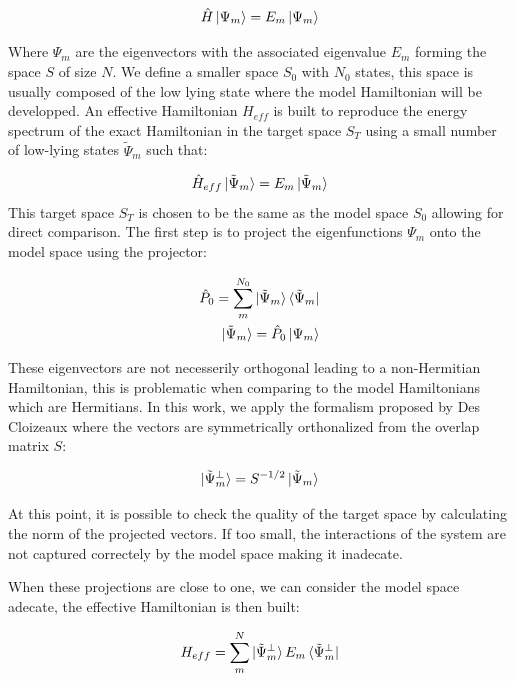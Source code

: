 \documentclass[10pt]{report}
\numberwithin{equation}{section}
\begin{document}
\begin{equation}
    \hat{H}\ket{\Psi_m}=E_m\ket{\Psi_m}
\end{equation}

Where $\Psi_m$ are the eigenvectors with the associated eigenvalue $E_m$ forming the space $S$ of size $N$. 
We define a smaller space $S_0$ with $N_0$ states, this space is usually composed of the low lying state where the model Hamiltonian will be developped.
An effective Hamiltonian $H_{eff}$  is built to reproduce the energy spectrum of the exact Hamiltonian in the target space $S_T$ using a small number of low-lying states $\tilde{\Psi}_m$ such that:

\begin{equation}
    \hat{H}_{eff}\ket{\tilde{\Psi}_m}=E_m \ket{\tilde{\Psi}_m}
\end{equation}
This target space $S_T$ is chosen to be the same as the model space $S_0$ allowing for direct comparison.
The first step is to project the eigenfunctions $\Psi_m$ onto the model space using the projector:

\begin{align}
    \hat{P}_0=\sum_{m}^{N_0} \ket{\tilde{\Psi}_m} \bra{\tilde{\Psi}_m}\\
    \ket{\tilde{\Psi}_m}=\hat{P}_0 \ket{\Psi_m}
\end{align}

These eigenvectors are not necesserily orthogonal leading to a non-Hermitian Hamiltonian, this is problematic when comparing to the model Hamiltonians which are Hermitians.
In this work, we apply the formalism proposed by Des Cloizeaux where the vectors are symmetrically orthonalized from the overlap matrix $S$:

\begin{equation}
    \ket{\tilde{\Psi}_m^\bot}=S^{-1/2} \ket{\tilde{\Psi}_m}
\end{equation}

At this point, it is possible to check the quality of the target space by calculating the norm of the projected vectors.
If too small, the interactions of the system are not captured correctely by the model space making it inadecate. 
\par When these projections are close to one, we can consider the model space adecate, the effective Hamiltonian is then built:

\begin{equation}
    H_{eff}=\sum_{m}^{N}\ket{\tilde{\Psi}_m^{\bot}}E_m \bra{\tilde{\Psi}_m^{\bot}}
\end{equation}
\end{document}
